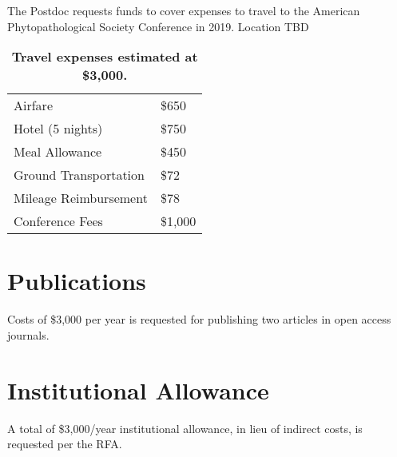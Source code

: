 \documentclass[12pt,letterpaper]{article}
\begin{document}
The Postdoc requests funds to cover expenses to travel to the American Phytopathological Society Conference in 2019.  Location TBD


\begin{table}[h!]
\centering
\begin{tabular}{ll}
\hline
	Airfare	& \$650 \\
	Hotel (5 nights) 	& \$750 \\
	Meal Allowance	& \$450 \\
	Ground Transportation	& \$72 \\
	Mileage Reimbursement	& \$78 \\
	Conference Fees	& \$1,000\\\hline
\end{tabular}
\caption{\textbf{Travel expenses estimated at \$3,000.}}
\end{table}


\section{Publications}
Costs of \$3,000 per year is requested for publishing two articles in open access journals.  

\section{Institutional Allowance}
A total of \$3,000/year institutional allowance, in lieu of indirect costs, is requested per the RFA.  
\end{document}
